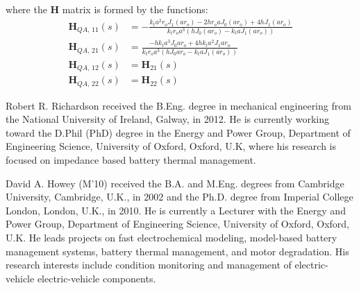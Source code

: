 \documentclass[journal, english]{IEEEtran}
\begin{document}
where the $\mathbf{H}$ matrix is formed by the functions:
\begin{align}
\mathbf{H}_{QA,\,11}(s) & =-\frac{k_{t} a^2 r_{o} J_{1}(a r_o)-2hr_{o} a J_{0}(a r_o)+4hJ_{1}(a r_o)}{k_{t}r_{o} a^3 \left(hJ_{0}(a r_o)-k_{t} a J_{1}(a r_o)\right)}\\
\mathbf{H}_{QA,\,21}(s) & =\frac{-hk_{t} a^3 J_{0}a r_o+4hk_{t} a^2 J_{1}a r_o}{k_{t}r_{o} a^3 \left(hJ_{0}a r_o-k_{t} a J_{1}(a r_o)\right)}\\
\mathbf{H}_{QA,\,12}(s) & =\mathbf{H}_{21}(s)\\
\mathbf{H}_{QA,\,22}(s) & =\mathbf{H}_{22}(s)
\end{align}












\begin{IEEEbiography}
{Robert R. Richardson}
received the B.Eng. degree in mechanical engineering from the National University of Ireland, Galway, in 2012. He is currently working toward the D.Phil (PhD) degree in the Energy and Power Group, Department of Engineering Science, University of Oxford, Oxford, U.K, where his research is focused on impedance based battery thermal management.
\end{IEEEbiography}

\begin{IEEEbiography}
{David A. Howey}
(M\textquoteright{}10) received the B.A. and M.Eng. degrees from Cambridge University, Cambridge, U.K., in 2002 and the Ph.D. degree from Imperial College London, London, U.K., in 2010. He is currently a Lecturer with the Energy and Power Group, Department of Engineering Science, University of Oxford, Oxford, U.K. He leads projects on fast electrochemical modeling, model-based battery management systems, battery thermal management, and motor degradation. His research interests include condition monitoring and management of electric-vehicle electric-vehicle components.
\end{IEEEbiography}

\vfill
\end{document}
